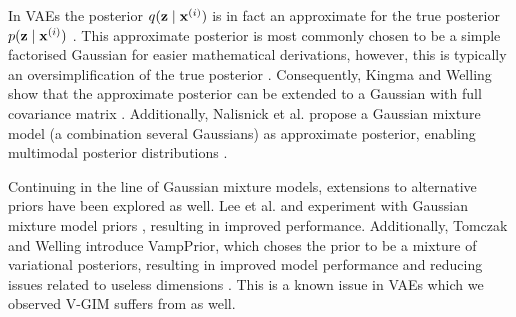 	In VAEs the posterior $q (\mathbf{z} \mid \mathbf{x}^{(i)})$ is in fact an approximate for the true posterior $p (\mathbf{z} \mid \mathbf{x}^{(i)})$ \cite{odaiboTutorialDerivingStandard2019}. This approximate posterior is most commonly chosen to be a simple factorised Gaussian for easier mathematical derivations, however, this is typically an oversimplification of the true posterior \cite{nalisnickApproximateInferenceDeep}. Consequently, Kingma and Welling show that the approximate posterior can be extended to a Gaussian with full covariance matrix \cite{kingmaIntroductionVariationalAutoencoders2019}. Additionally, Nalisnick et al. propose a Gaussian mixture model (a combination several Gaussians) as approximate posterior, enabling multimodal posterior distributions \cite{nalisnickApproximateInferenceDeep}.
	
	Continuing in the line of Gaussian mixture models, extensions to alternative priors have been explored as well. Lee et al. and experiment with Gaussian mixture model priors \cite{leeMetaGMVAEMixtureGaussian2021, guoVariationalAutoencoderOptimizing2020}, resulting in improved performance. Additionally, Tomczak and Welling introduce VampPrior, which choses the prior to be a mixture of variational posteriors, resulting in improved model performance and reducing issues related to useless dimensions \cite{tomczakVAEVampPrior2018}. This is a known issue in VAEs which we observed V-GIM suffers from as well.












%	
%	
%	


